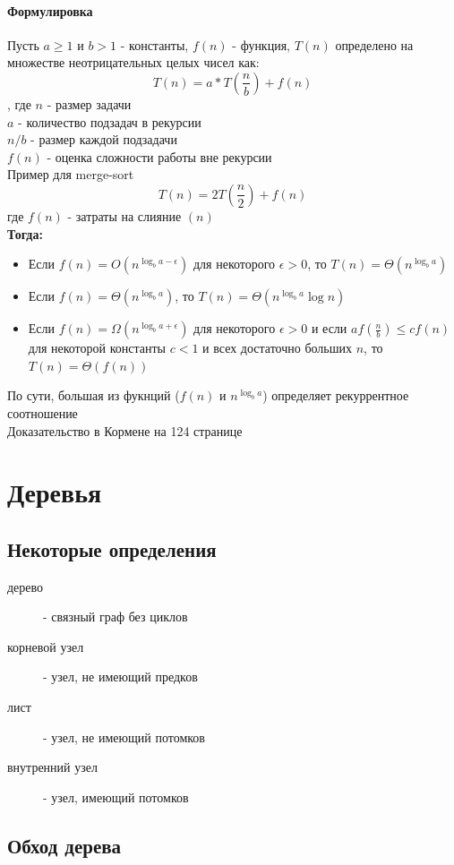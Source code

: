 \documentclass[a4paper,10pt]{article}
\begin{document}
	\paragraph{Формулировка} Пусть  $a \geq 1$ и $b > 1$ - константы, $f(n)$ - функция, $T(n)$ определено на множестве неотрицательных целых чисел как: 
	\[
		T(n) = a*T(\frac{n}{b}) + f(n)
	\], где $n$ - размер задачи \\
	$a$ - количество подзадач в рекурсии \\
	$n/b$ - размер каждой подзадачи \\
	$f(n)$ - оценка сложности работы вне рекурсии \\
	Пример для merge-sort 
	\[	
		T(n) = 2T(\frac{n}{2}) + f(n)
	\]	
	где $f(n)$ - затраты на слияние $(n)$\\
	\textbf{Тогда:}
	\begin{itemize}
		\item Если $f(n) = O(n^{\log_b a - \epsilon})$ для некоторого $\epsilon > 0$, то $T(n) = \Theta(n^{\log_b a})$
		\item Если $f(n) = \Theta(n^{\log_b a})$, то $T(n) = \Theta(n^{\log_b a} \log n)$
		\item Если $f(n) = \Omega(n^{\log_b a + \epsilon})$ для некоторого $\epsilon > 0$ и если $af(\frac{n}{b}) \leq cf(n)$ для некоторой константы $c < 1$ и всех достаточно больших $n$, то $T(n) = \Theta(f(n))$
	\end{itemize}
	По сути, большая из фукнций ($f(n)$ и $n^{\log_b a}$) определяет рекуррентное соотношение \\
	Доказательство в Кормене на 124 странице \\
\section{Деревья}
\subsection{Некоторые определения}
\begin{description}
	\item[дерево] - связный граф без циклов
	\item[корневой узел] - узел, не имеющий предков
	\item[лист] - узел, не имеющий потомков
	\item[внутренний узел] - узел, имеющий потомков
\end{description}
\subsection{Обход дерева}
\end{document}
